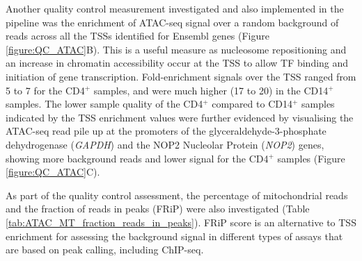 Another quality control measurement investigated and also implemented in the pipeline was the enrichment of ATAC-seq signal over a random background of reads across all the TSSs identified for Ensembl genes (Figure \ref{figure:QC_ATAC}B). This is a useful measure as nucleosome repositioning and an increase in chromatin accessibility occur at the TSS to allow TF binding and initiation of gene transcription. Fold-enrichment signals over the TSS ranged from 5 to 7 for the CD4$^+$ samples, and were much higher (17 to 20) in the CD14$^+$ samples. The lower sample quality of the CD4$^+$ compared to CD14$^+$ samples indicated by the TSS enrichment values were further evidenced by visualising the ATAC-seq read pile up at the promoters of the glyceraldehyde-3-phosphate dehydrogenase (\textit{GAPDH}) and the NOP2 Nucleolar Protein (\textit{NOP2}) genes, showing more background reads and lower signal for the CD4$^+$ samples (Figure \ref{figure:QC_ATAC}C).
	
As part of the quality control assessment, the percentage of mitochondrial reads and the fraction of reads in peaks (FRiP) were also investigated (Table \ref{tab:ATAC_MT_fraction_reads_in_peaks}). FRiP score is an alternative to TSS enrichment for assessing the background signal in different types of assays that are based on peak calling, including ChIP-seq.

